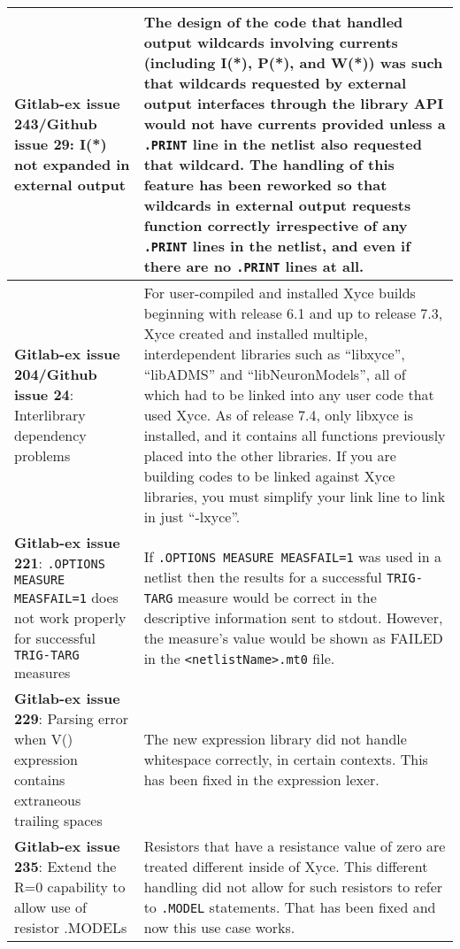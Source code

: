 {\begin{longtable}[h] {>{\raggedright\small}m{2in}|>{\raggedright\let\\\tabularnewline\small}m{3.5in}}
\textbf{Gitlab-ex issue 243/Github issue 29}: I(*) not expanded in external output &
The design of the code that handled output wildcards involving
currents (including I(*), P(*), and W(*)) was such that wildcards
requested by external output interfaces through the library API would
not have currents provided unless a \texttt{.PRINT} line in the
netlist also requested that wildcard.  The handling of this feature
has been reworked so that wildcards in external output requests
function correctly irrespective of any \texttt{.PRINT} lines in the
netlist, and even if there are no \texttt{.PRINT} lines at
all.\\ \hline

\textbf{Gitlab-ex issue 204/Github issue 24}: Interlibrary dependency problems &
For user-compiled and installed Xyce builds beginning with release 6.1
and up to release 7.3, Xyce created and installed multiple,
interdependent libraries such as ``libxyce'', ``libADMS'' and
``libNeuronModels'', all of which had to be linked into any user code
that used Xyce.  As of release 7.4, only libxyce is installed, and it
contains all functions previously placed into the other libraries.  If
you are building codes to be linked against Xyce libraries, you must
simplify your link line to link in just ``-lxyce''.\\ \hline

  \textbf{Gitlab-ex issue 221}: \texttt{.OPTIONS MEASURE MEASFAIL=1}
does not work properly for successful \texttt{TRIG-TARG} measures &
If \texttt{.OPTIONS MEASURE MEASFAIL=1} was used in a netlist then the
results for a successful \texttt{TRIG-TARG} measure would be correct
in the descriptive information sent to stdout.  However, the measure's
value would be shown as FAILED in the \texttt{<netlistName>.mt0}
file. \\ \hline

  \textbf{Gitlab-ex issue 229}: Parsing error when V() expression
contains extraneous trailing spaces & The new expression library did
not handle whitespace correctly, in certain contexts.  This has been
fixed in the expression lexer.  \\ \hline

  \textbf{Gitlab-ex issue 235}: Extend the R=0 capability to allow use
of resistor .MODELs & Resistors that have a resistance value of zero
are treated different inside of Xyce.  This different handling did not
allow for such resistors to refer to \texttt{.MODEL} statements.  That
has been fixed and now this use case works.  \\ \hline


\end{longtable}}
